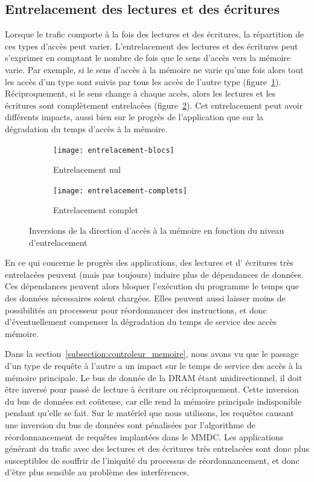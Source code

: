 \subsection{\label{subsection:dbi}Entrelacement des lectures et des écritures}

Lorsque le trafic comporte à la fois des lectures et des écritures, la répartition de ces types d'accès peut varier.
L'entrelacement des lectures et des écritures peut s'exprimer en comptant le nombre de fois que le sens d'accès vers la mémoire varie.
Par exemple, si le sens d'accès à la mémoire ne varie qu'une fois alors tout les accès d'un type sont suivis par tous les accès de l'autre type (figure~\ref{fig:rw_desentrelac}).
Réciproquement, si le sens change à chaque accès, alors les lectures et les écritures sont complètement entrelacées (figure~\ref{fig:rw_full_entrelac}).
Cet entrelacement peut avoir différents impacts, aussi bien sur le progrès de l'application que sur la dégradation du temps d'accès à la mémoire.

\begin{figure}[H]
	\begin{subfigure}{\linewidth}
		\texttt{[image: entrelacement-blocs]}
		\caption{\label{fig:rw_desentrelac}Entrelacement nul}
	\end{subfigure}
	
	\begin{subfigure}{\linewidth}
		\texttt{[image: entrelacement-complets]}
		\caption{\label{fig:rw_full_entrelac}Entrelacement complet}
	\end{subfigure}
	\caption{\label{fig:rw_distribution}Inversions de la direction d'accès à la mémoire en fonction du niveau d'entrelacement}
\end{figure}

En ce qui concerne le progrès des applications, des lectures et d’ écritures très entrelacées peuvent (mais pas toujours) induire plus de dépendances de données.
Ces dépendances peuvent alors bloquer l'exécution du programme le temps que des données nécessaires soient chargées.
Elles peuvent aussi laisser moins de possibilités au processeur pour réordonnancer des instructions, et donc d'éventuellement compenser la dégradation du temps de service des accès mémoire.

Dans la section~\ref{subsection:controleur_memoire}, nous avons vu que le passage d'un type de requête à l'autre a un impact sur le temps de service des accès à la mémoire principale.
Le bus de donnée de la DRAM étant unidirectionnel, il doit être inversé pour passé de lecture à écriture ou réciproquement.
Cette inversion du bus de données est coûteuse, car elle rend la mémoire principale indisponible pendant qu'elle se fait.
Sur le matériel que nous utilisons, les requêtes causant une inversion du bus de données sont pénalisées par l'algorithme de réordonnancement de requêtes implantées dans le MMDC.
Les applications générant du trafic avec des lectures et des écritures très entrelacées sont donc plus susceptibles de souffrir de l'iniquité du processus de réordonnancement, et donc d'être plus sensible au problème des interférences.

